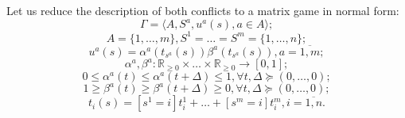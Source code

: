 Let us reduce the description of both conflicts to a matrix game in normal form: %
\begin{equation*}
	\Gamma = \langle A, S^a, u^a(s), a \in A \rangle;
\end{equation*}
\begin{equation*}
	A = \{1, \ldots, m\}, S^1 = \ldots = S^m = \{1, \ldots, n\};
\end{equation*}
\begin{equation*}
	u^a(s) = \alpha^a(t_{s^a}(s)) \beta^a(t_{s^a}(s)), a = \overline{1,m};
\end{equation*}
\begin{equation*}
	\alpha^a, \beta^a : \mathbb{R}_{\ge 0} \times \ldots \times \mathbb{R}_{\ge 0} \rightarrow [0, 1];
\end{equation*}
\begin{equation*}
	0 \le \alpha^a(t) \le \alpha^a(t + \Delta) \le 1, \forall t, \Delta \succeq (0, \ldots, 0);
\end{equation*}
\begin{equation*}
	1 \ge \beta^a(t) \ge \beta^a(t + \Delta) \ge 0, \forall t, \Delta \succeq (0, \ldots, 0);
\end{equation*}
\begin{equation*}
	t_i(s) = [s^1 = i] t_i^1 + \ldots + [s^m = i] t_i^m, i = \overline{1,n}.
\end{equation*}

